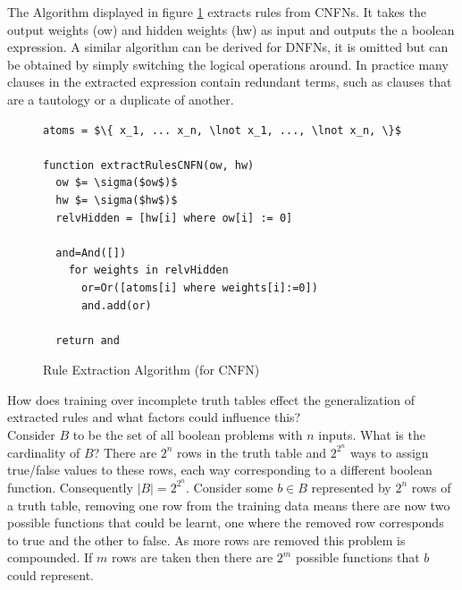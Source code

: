 \noindent
\begin{minipage}[t]{0.3\textwidth}
\vspace{0px}
The Algorithm displayed in figure \ref{alg:rule-extraction} extracts rules from CNFNs. It takes the output weights (ow) and hidden weights (hw) as input and outputs the a boolean expression. A similar algorithm can be derived for DNFNs, it is omitted but can be obtained by simply switching the logical operations around. In practice many clauses in the extracted expression contain redundant terms, such as clauses that are a tautology or a duplicate of another.\\
\end{minipage}
\hspace{0.05\textwidth}
\begin{minipage}[t]{0.65\textwidth}
\vspace{0px}
\begin{figure}[H]
	\begin{lstlisting}[mathescape=true]
atoms = $\{ x_1, ... x_n, \lnot x_1, ..., \lnot x_n, \}$
	
function extractRulesCNFN(ow, hw)
  ow $= \sigma($ow$)$
  hw $= \sigma($hw$)$
  relvHidden = [hw[i] where ow[i] := 0]

  and=And([])
    for weights in relvHidden
      or=Or([atoms[i] where weights[i]:=0])
      and.add(or)
		
  return and
	\end{lstlisting}
	\caption{Rule Extraction Algorithm (for CNFN)}
	\label{alg:rule-extraction}
\end{figure}
\end{minipage}

How does training over incomplete truth tables effect the generalization of extracted rules and what factors could influence this?\\

Consider $B$ to be the set of all boolean problems with $n$ inputs. What is the cardinality of $B$? There are $2^n$ rows in the truth table and $2^{2^n}$ ways to assign true/false values to these rows, each way corresponding to a different boolean function. Consequently $|B| = 2^{2^n}$. Consider some $b \in B$ represented by $2^n$ rows of a truth table, removing one row from the training data means there are now two possible functions that could be learnt, one where the removed row corresponds to true and the other to false. As more rows are removed this problem is compounded. If $m$ rows are taken then there are $2^m$ possible functions that $b$ could represent.\\

